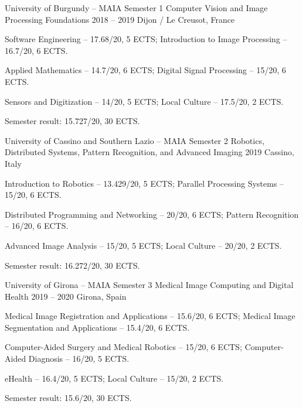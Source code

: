 
\begin{cventries}
\cventry
  {University of Burgundy -- MAIA Semester 1}
  {Computer Vision and Image Processing Foundations}
  {2018 -- 2019}
  {Dijon / Le Creusot, France}
  {
    \begin{cvitems}
      \item {Software Engineering -- 17.68/20, 5 ECTS; Introduction to Image Processing -- 16.7/20, 6 ECTS.}
      \item {Applied Mathematics -- 14.7/20, 6 ECTS; Digital Signal Processing -- 15/20, 6 ECTS.}
      \item {Sensors and Digitization -- 14/20, 5 ECTS; Local Culture -- 17.5/20, 2 ECTS.}
      \item {Semester result: 15.727/20, 30 ECTS.}
    \end{cvitems}
  }

\cventry
  {University of Cassino and Southern Lazio -- MAIA Semester 2}
  {Robotics, Distributed Systems, Pattern Recognition, and Advanced Imaging}
  {2019}
  {Cassino, Italy}
  {
    \begin{cvitems}
      \item {Introduction to Robotics -- 13.429/20, 5 ECTS; Parallel Processing Systems -- 15/20, 6 ECTS.}
      \item {Distributed Programming and Networking -- 20/20, 6 ECTS; Pattern Recognition -- 16/20, 6 ECTS.}
      \item {Advanced Image Analysis -- 15/20, 5 ECTS; Local Culture -- 20/20, 2 ECTS.}
      \item {Semester result: 16.272/20, 30 ECTS.}
    \end{cvitems}
  }

\cventry
  {University of Girona -- MAIA Semester 3}
  {Medical Image Computing and Digital Health}
  {2019 -- 2020}
  {Girona, Spain}
  {
    \begin{cvitems}
      \item {Medical Image Registration and Applications -- 15.6/20, 6 ECTS; Medical Image Segmentation and Applications -- 15.4/20, 6 ECTS.}
      \item {Computer-Aided Surgery and Medical Robotics -- 15/20, 6 ECTS; Computer-Aided Diagnosis -- 16/20, 5 ECTS.}
      \item {eHealth -- 16.4/20, 5 ECTS; Local Culture -- 15/20, 2 ECTS.}
      \item {Semester result: 15.6/20, 30 ECTS.}
    \end{cvitems}
  }


\end{cventries}
